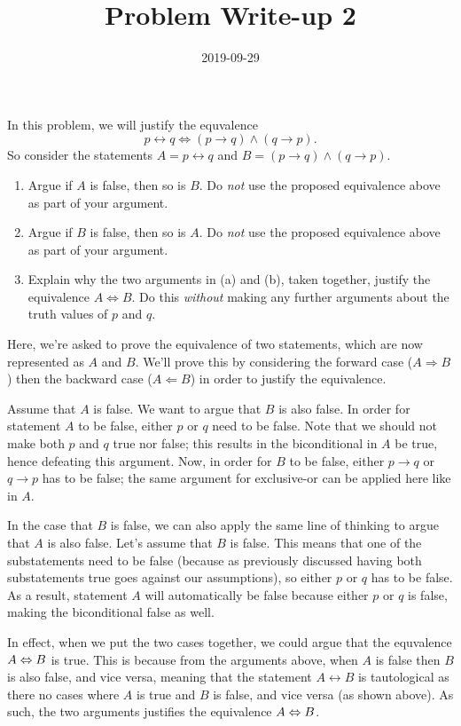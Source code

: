 \documentclass[a4paper,12pt]{article}
\title{Problem Write-up 2}
\date{2019-09-29}
\begin{document}
    \begin{problem}
        In this problem, we will justify the equvalence \[p \leftrightarrow q \Leftrightarrow (p \to q) \wedge (q \to p).\]
        So consider the statements \(A = p \leftrightarrow q\) and \(B = (p \to q) \wedge (q \to p)\).

        \begin{enumerate}
                \item Argue if \(A\) is false, then so is \(B\). Do \textit{not} use the proposed equivalence above as part of your argument.
                \item Argue if \(B\) is false, then so is \(A\). Do \textit{not} use the proposed equivalence above as part of your argument.
                \item Explain why the two arguments in (a) and (b), taken together, justify the equivalence \(A \Leftrightarrow B\). Do this \textit{without} making any further arguments about the truth values of \(p\) and \(q\).
        \end{enumerate}
    \end{problem}

    \begin{answer}
        Here, we're asked to prove the equivalence of two statements, which are now represented as \(A\) and \(B\). We'll prove this by considering the forward case (\(A \Rightarrow B\)) then the backward case (\( A \Leftarrow B \)) in order to justify the equivalence.

        Assume that \(A\) is false. We want to argue that \(B\) is also false. In order for statement \(A\) to be false, either \(p\) or \(q\) need to be false. Note that we should not make both \(p\) and \(q\) true nor false; this results in the biconditional in \(A\) be true, hence defeating this argument. Now, in order for \(B\) to be false, either \(p \to q\) or \(q \to p\) has to be false; the same argument for exclusive-or can be applied here like in \(A\).

        In the case that \(B\) is false, we can also apply the same line of thinking to argue that \(A\) is also false. Let's assume that \(B\) is false. This means that one of the substatements need to be false (because as previously discussed having both substatements true goes against our assumptions), so either \(p\) or \(q\) has to be false. As a result, statement \(A\) will automatically be false because either \(p\) or \(q\) is false, making the biconditional false as well.

        In effect, when we put the two cases together, we could argue that the equvalence \(A \Leftrightarrow B\) is true. This is because from the arguments above, when \(A\) is false then \(B\) is also false, and vice versa, meaning that the statement \(A \leftrightarrow B\) is tautological as there no cases where \(A\) is true and \(B\) is false, and vice versa (as shown above). As such, the two arguments justifies the equivalence \(A \Leftrightarrow B\). 
    \end{answer}
\end{document}
